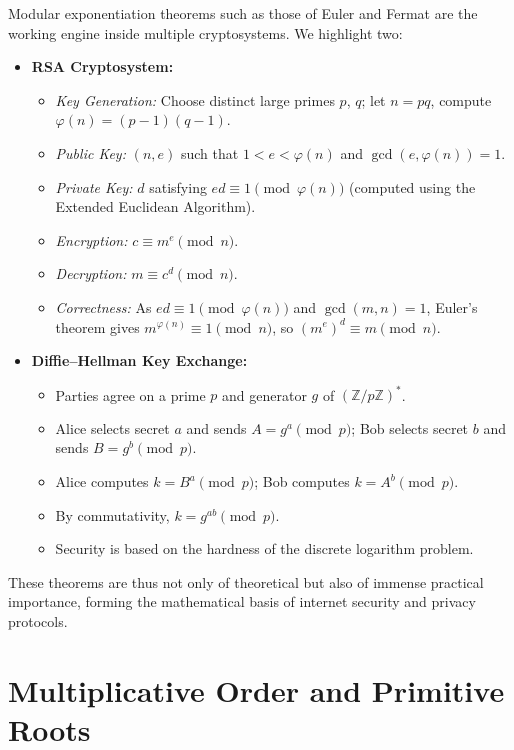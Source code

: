 \documentclass[12pt,openany]{book}
\theoremstyle{definition}
\theoremstyle{plain}
\theoremstyle{remark}
\begin{document}
Modular exponentiation theorems such as those of Euler and Fermat are the working engine inside multiple cryptosystems. We highlight two:

\begin{itemize}
  \item \textbf{RSA Cryptosystem:}
    \begin{itemize}
      \item \emph{Key Generation:} Choose distinct large primes $p$, $q$; let $n = pq$, compute $\varphi(n) = (p-1)(q-1)$.
      \item \emph{Public Key:} $(n, e)$ such that $1 < e < \varphi(n)$ and $\gcd(e, \varphi(n)) = 1$.
      \item \emph{Private Key:} $d$ satisfying $e d \equiv 1 \pmod{\varphi(n)}$ (computed using the Extended Euclidean Algorithm).
      \item \emph{Encryption:} $c \equiv m^e \pmod{n}$.
      \item \emph{Decryption:} $m \equiv c^d \pmod{n}$.
      \item \emph{Correctness:} As $ed \equiv 1 \pmod{\varphi(n)}$ and $\gcd(m, n)=1$, Euler’s theorem gives $m^{\varphi(n)} \equiv 1 \pmod{n}$, so $(m^e)^d \equiv m \pmod{n}$.
    \end{itemize}
  \item \textbf{Diffie–Hellman Key Exchange:}
    \begin{itemize}
      \item Parties agree on a prime $p$ and generator $g$ of $(\mathbb{Z}/p\mathbb{Z})^*$.
      \item Alice selects secret $a$ and sends $A = g^a \pmod{p}$; Bob selects secret $b$ and sends $B = g^b \pmod{p}$.
      \item Alice computes $k = B^a \pmod{p}$; Bob computes $k = A^b \pmod{p}$.
      \item By commutativity, $k = g^{ab} \pmod{p}$.
      \item Security is based on the hardness of the discrete logarithm problem.
    \end{itemize}
\end{itemize}

These theorems are thus not only of theoretical but also of immense practical importance, forming the mathematical basis of internet security and privacy protocols.

\chapter{Multiplicative Order and Primitive Roots}
\end{document}
